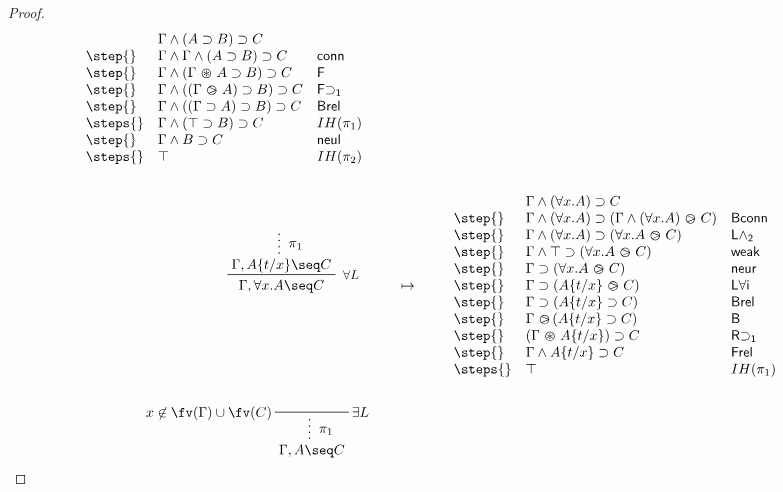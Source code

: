 \begin{proof}
\begin{align*}
\begin{array}{lll}
            & \Gamma \land (A \limp B) \limp C & \\
      \step{} & \Gamma \land \Gamma \land (A \limp B) \limp C & \mathsf{conn} \\
      \step{} & \Gamma \land (\Gamma \forw A \limp B) \limp C & \mathsf{F} \\
      \step{} & \Gamma \land ((\Gamma \back A) \limp B) \limp C & \mathsf{F{\limp}_1} \\
      \step{} & \Gamma \land ((\Gamma \limp A) \limp B) \limp C & \mathsf{Brel} \\
      \steps{} & \Gamma \land (\top \limp B) \limp C & IH(\pi_1) \\
      \step{} & \Gamma \land B \limp C & \mathsf{neul} \\
      \steps{} & \top & IH(\pi_2)
    \end{array}
    \\\\
    \R[\forall L]
      {\summ[$\pi_1$]{\Gamma, \subst{A}{t}{x} \seq C}}
      {\Gamma, \forall x. A \seq C}
    &\mt
    \begin{array}{lll}
            & \Gamma \land (\forall x. A) \limp C & \\
      \step{} & \Gamma \land (\forall x. A) \limp (\Gamma \land (\forall x. A) \back C) & \mathsf{Bconn} \\
      \step{} & \Gamma \land (\forall x. A) \limp (\forall x. A \back C) & \mathsf{L\land_2} \\
      \step{} & \Gamma \land \top \limp (\forall x. A \back C) & \mathsf{weak} \\
      \step{} & \Gamma \limp (\forall x. A \back C) & \mathsf{neur} \\
      \step{} & \Gamma \limp (\subst{A}{t}{x} \back C) & \mathsf{L\forall i} \\
      \step{} & \Gamma \limp (\subst{A}{t}{x} \limp C) & \mathsf{Brel} \\
      \step{} & \Gamma \back (\subst{A}{t}{x} \limp C) & \mathsf{B} \\
      \step{} & (\Gamma \forw \subst{A}{t}{x}) \limp C & \mathsf{R{\limp}_1} \\
      \step{} & \Gamma \land \subst{A}{t}{x} \limp C & \mathsf{Frel} \\
      \steps{} & \top & IH(\pi_1)
    \end{array}
    \\\\
    \prftree[r][l]{$\exists L$}{$x \not\in \fv(\Gamma) \cup \fv(C)$}
      {\summ[$\pi_1$]{\Gamma, A \seq C}}

\end{align*}
\end{proof}
